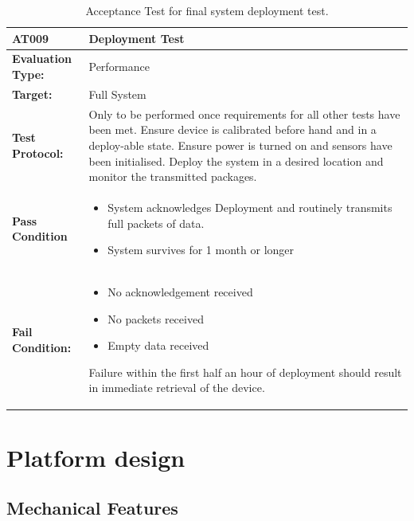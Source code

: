 \begin{table}[H]
    \centering
    \caption{Acceptance Test for final system deployment test.}
    \begin{tabular}{|m{}|m{}|}
    \hline
   \textbf{AT009 }& \textbf{Deployment Test} \\
     \hline
    \textbf{Evaluation Type:} & Performance\\
     \hline
    \textbf{Target: } & Full System \\
    \hline
    \textbf{Test Protocol:} & Only to be performed once requirements for all other tests have been met. Ensure device is calibrated before hand and in a deploy-able state. Ensure power is turned on and sensors have been initialised. Deploy the system in a desired location and monitor the transmitted packages. \\
    \hline
    \textbf{Pass Condition} & \vspace{5pt} \begin{itemize}
        \item System acknowledges Deployment and routinely transmits full packets of data.
        \item System survives for 1 month or longer
    \end{itemize} \\
    \hline
    \textbf{Fail Condition:} & \vspace{5pt} \begin{itemize}
        \item No acknowledgement received
        \item No packets received
        \item Empty data received
        \end{itemize}
        Failure within the first half an hour of deployment should result in immediate retrieval of the device.\\
        \hline
    \end{tabular}
    \label{tab:AT009}
\end{table}

\chapter{Platform design}
\label{sec:ch3_platform}

\section{Mechanical Features}

